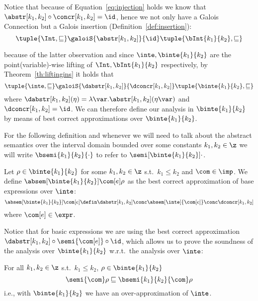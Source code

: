 Notice that because of Equation~\eqref{eq:injection} holds we know
that \(\abstr[k_1,k_2] \circ\concr[k_1,k_2] = \id\), hence we not only
have a Galois Connection but a Galois insertion
(Definition~\ref{def:insertion}):
\begin{equation}
  \tuple{\Int, \sqsubseteq} \galoiS{\abstr[k_1, k_2]}{\id} \tuple{\bInt{k_1}{k_2}, \sqsubseteq}
\end{equation}

because of the latter observation and since
\(\inte, \binte{k_1}{k_2}\) are the point(variable)-wise lifting of
\(\Int, \bInt{k_1}{k_2}\) respectively, by Theorem~\ref{th:liftingins}
it holds that
\begin{equation}\label{eq:inteinsert}
  \tuple{\inte, \sqsubseteq} \galoiS{\dabstr[k_1,k_2]}{\dconcr[k_1,k_2]} \tuple{\binte{k_1}{k_2}, \sqsubseteq}
\end{equation}
where
\({\dabstr[k_1,k_2]}(\eta) = \lambda \var
. \abstr[k_1,k_2](\eta\var)\) and \(\dconcr[k_1,k_2] = \id\).
We can therefore define our analysis in \(\binte{k_1}{k_2}\) by means
of best correct approximations over \(\binte{k_1}{k_2}\).

\begin{notation}
  For the following definition and whenever we will need to talk about
  the abstract semantics over the interval domain bounded over some
  constants \(k_1, k_2 \in \z\) we will write
  \(\bsemi{k_1}{k_2}{\cdot}\) to refer to
  \(\semi[\binte{k_1}{k_2}]{\cdot}\).
\end{notation}

\begin{definition}\label{def:boundedanalysis}
  Let \(\rho \in \binte{k_1}{k_2}\) for some \(k_1, k_2 \in \z\) s.t.\
  \(k_1 \leq k_2\) and \(\com \in \imp\). We define
  \(\absem[\binte{k_1}{k_2}]{\com[e]}\rho\) as the best correct
  approximation of base expressions over \(\inte\):
  \begin{equation*}
    \absem[\binte{k_1}{k_2}]{\com[e]} \defin \dabstr[k_1,k_2] \conc \absem[\inte]{\com[e]} \conc \dconcr[k_1,k_2]
  \end{equation*}
  where \(\com[e]\in\expr\). 
\end{definition}
\noindent
Notice that for basic expressions we are using the best correct
approximation \(\dabstr[k_1,k_2] \circ \semi{\com[e]} \circ \id\),
which allows us to prove the soundness of the analysis over
\(\binte{k_1}{k_2}\) w.r.t.\ the analysis over \(\inte\):
\begin{lemma}\label{le:leq}
  For all \(k_1, k_2\in\z\) s.t.\ \(k_1 \leq k_2\),
  \(\rho \in \binte{k_1}{k_2}\)
  \begin{equation*}
    \semi{\com}\rho \sqsubseteq \bsemi{k_1}{k_2}{\com}\rho
  \end{equation*}
  i.e., with \(\binte{k_1}{k_2}\) we have an over-approximation of \(\inte\).
\end{lemma}

